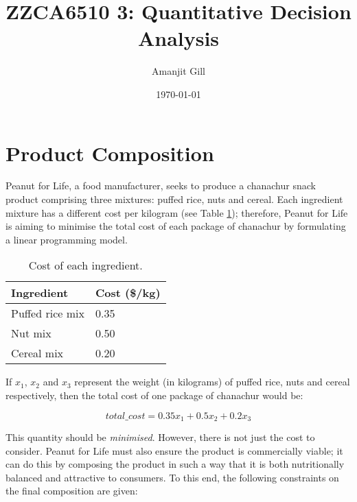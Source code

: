 \documentclass[11pt, a4paper]{article}
\title{\LARGE\bfseries ZZCA6510 3: Quantitative Decision Analysis}
\author{\Large Amanjit Gill}
\date{\normalsize \today}
\begin{document}
    
    \maketitle

    \thispagestyle{empty}

    \newpage

    \addtocounter{page}{-1}

    \section{Product Composition}

    Peanut for Life, a food manufacturer, seeks to produce a chanachur snack product comprising three mixtures: puffed rice, nuts and cereal. Each ingredient mixture has a different cost per kilogram (see Table \ref{costs}); therefore, Peanut for Life is aiming to minimise the total cost of each package of chanachur by formulating a linear programming model. 
    
    \begin{table}[!ht]
        \centering
        \caption{Cost of each ingredient.}
        \begin{tabular}{|l|l|}
            \hline
            Ingredient & Cost (\$/kg) \\ \hline
            Puffed rice mix & 0.35 \\ \hline
            Nut mix & 0.50 \\ \hline
            Cereal mix & 0.20 \\ \hline          
        \end{tabular}
        \label{costs}
    \end{table}
    
    
    If $x_{1}$, $x_{2}$ and $x_{3}$ represent the weight (in kilograms) of puffed rice, nuts and cereal respectively, then the total cost of one package of chanachur would be:

    \begin{equation}
        total\_cost = 0.35x_1 + 0.5x_2 + 0.2x_3
        \label{obj_func}
    \end{equation}
    

    This quantity should be \textit{minimised}. However, there is not just the cost to consider. Peanut for Life must also ensure the product is commercially viable; it can do this by composing the product in such a way that it is both nutritionally balanced and attractive to consumers. To this end, the following constraints on the final composition are given:
\end{document}
